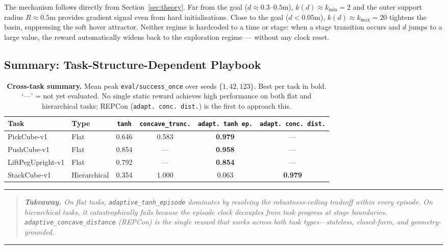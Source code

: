 \documentclass{article}
\newenvironment{keyinsight}{%
  \vspace{4pt}\noindent\rule{\linewidth}{0.5pt}\vspace{2pt}%
  \begin{quote}\small\itshape}%
 {\end{quote}\vspace{2pt}\noindent\rule{\linewidth}{0.5pt}\vspace{4pt}}
\newcommand{\m}[1]{\texttt{#1}}
\begin{document}
The mechanism follows directly from Section~\ref{sec:theory}. Far from the goal
($d \approx 0.3$--$0.5$m), $k(d) \approx k_{\min} = 2$ and the outer support radius
$R \approx 0.5$m provides gradient signal even from hard initialisations. Close to the
goal ($d < 0.05$m), $k(d) \approx k_{\max} = 20$ tightens the basin, suppressing the
soft hover attractor. Neither regime is hardcoded to a time or stage: when a stage
transition occurs and $d$ jumps to a large value, the reward automatically widens back
to the exploration regime --- without any clock reset.

\subsection{Summary: Task-Structure-Dependent Playbook}
\label{sec:playbook-summary}

\begin{table}[h]
\centering
\small
\caption{\textbf{Cross-task summary.} Mean peak \texttt{eval/success\_once} over
seeds $\{1,42,123\}$. Best per task in bold. `---' = not yet evaluated. No single
static reward achieves high performance on both flat and hierarchical tasks; REPCon
(\m{adapt.\ conc.\ dist.}) is the first to approach this.}
\label{tab:crosssummary}
\begin{tabular}{@{}llcccc@{}}
\toprule
\textbf{Task} & \textbf{Type} & \textbf{\texttt{tanh}} & \textbf{\texttt{concave\_trunc.}}
    & \textbf{\texttt{adapt.\ tanh\ ep.}} & \textbf{\texttt{adapt.\ conc.\ dist.}} \\
\midrule
PickCube-v1       & Flat         & 0.646 & 0.583 & \textbf{0.979} & --- \\
PushCube-v1       & Flat         & 0.854 & ---   & \textbf{0.958} & --- \\
LiftPegUpright-v1 & Flat         & 0.792 & ---   & \textbf{0.854} & --- \\
StackCube-v1      & Hierarchical & 0.354 & 1.000 & 0.063          & \textbf{0.979} \\
\bottomrule
\end{tabular}
\end{table}

\begin{keyinsight}
\textbf{Takeaway.} On flat tasks, \m{adaptive\_tanh\_episode} dominates by resolving
the robustness-ceiling tradeoff within every episode. On hierarchical tasks, it
catastrophically fails because the episode clock decouples from task progress at stage
boundaries. \m{adaptive\_concave\_distance} (REPCon) is the single reward that works
across both task types---stateless, closed-form, and geometry-grounded.
\end{keyinsight}
\end{document}
